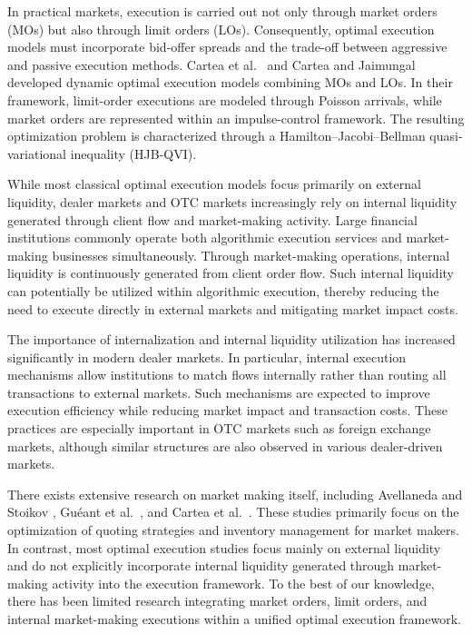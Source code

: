 \documentclass[12pt]{article}
\begin{document}
In practical markets, execution is carried out not only through market orders (MOs) but also through limit orders (LOs). 
Consequently, optimal execution models must incorporate bid-offer spreads and the trade-off between aggressive and passive execution methods. 
Cartea et al.~\cite{cartea2015algorithmic} and Cartea and Jaimungal \cite{cartea2015optimal} developed dynamic optimal execution models combining MOs and LOs. 
In their framework, limit-order executions are modeled through Poisson arrivals, while market orders are represented within an impulse-control framework. 
The resulting optimization problem is characterized through a Hamilton--Jacobi--Bellman quasi-variational inequality (HJB-QVI).

While most classical optimal execution models focus primarily on external liquidity, dealer markets and OTC markets increasingly rely on internal liquidity generated through client flow and market-making activity. 
Large financial institutions commonly operate both algorithmic execution services and market-making businesses simultaneously. 
Through market-making operations, internal liquidity is continuously generated from client order flow. 
Such internal liquidity can potentially be utilized within algorithmic execution, thereby reducing the need to execute directly in external markets and mitigating market impact costs.

The importance of internalization and internal liquidity utilization has increased significantly in modern dealer markets. 
In particular, internal execution mechanisms allow institutions to match flows internally rather than routing all transactions to external markets. 
Such mechanisms are expected to improve execution efficiency while reducing market impact and transaction costs. 
These practices are especially important in OTC markets such as foreign exchange markets, although similar structures are also observed in various dealer-driven markets.

There exists extensive research on market making itself, including Avellaneda and Stoikov \cite{avellaneda2008high}, Gu\'eant et al.~\cite{gueant2013dealing}, and Cartea et al.~\cite{cartea2017algorithmic}. 
These studies primarily focus on the optimization of quoting strategies and inventory management for market makers. 
In contrast, most optimal execution studies focus mainly on external liquidity and do not explicitly incorporate internal liquidity generated through market-making activity into the execution framework. 
To the best of our knowledge, there has been limited research integrating market orders, limit orders, and internal market-making executions within a unified optimal execution framework.
\end{document}
